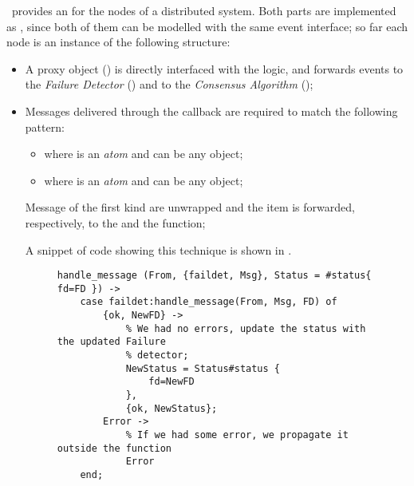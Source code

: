 \YUNA\ provides an  for the nodes of a
distributed system. Both parts are implemented as , since both of them can be modelled with the same event
interface; so far each node is an instance of the following structure:
\begin{itemize}

    \item   A proxy object () is directly interfaced
            with the  logic, and forwards
            events to the \emph{Failure Detector} () and
            to the \emph{Consensus Algorithm} ();

    \item   Messages delivered through the 
            callback are required to match the following pattern:

        \begin{itemize}

        \item   {} where  is an
                \emph{atom} and  can be any object;

        \item   {} where  is an
                \emph{atom} and  can be any object;

        \end{itemize}

            Message of the first kind are unwrapped and the 
            item is forwarded, respectively, to the
             and the
             function;

            A snippet of code showing this technique is shown in
            .

            \begin{figure}[hbt]
            \begin{lstlisting}[caption={Proxying for the failure detector},
                               label={code:Proxying}]
handle_message (From, {faildet, Msg}, Status = #status{ fd=FD }) ->
    case faildet:handle_message(From, Msg, FD) of
        {ok, NewFD} ->
            % We had no errors, update the status with the updated Failure
            % detector;
            NewStatus = Status#status {
                fd=NewFD
            },
            {ok, NewStatus};
        Error ->
            % If we had some error, we propagate it outside the function
            Error
    end;
            \end{lstlisting}
            \end{figure}


\end{itemize}
